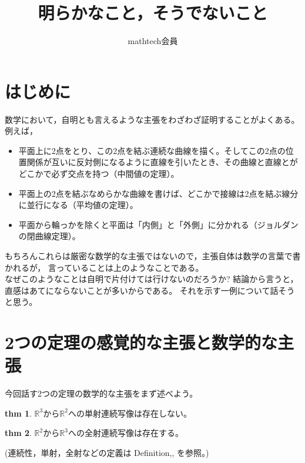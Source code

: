 \documentclass[uplatex]{jsarticle}
\begin{document}
\title{明らかなこと，そうでないこと}
\author{mathtech会員}
\date{}
\maketitle
\newcommand{\R}{\mathbb{R}}
\newcommand{\N}{\mathbb{N}}
\newcommand{\Q}{\mathbb{Q}}
\newcommand{\Z}{\mathbb{Z}}
\newcommand{\C}{\mathbb{C}}
\newcommand{\st}{\sin \theta}
\newcommand{\ct}{\cos \theta}
\newtheorem{命題}{命題}
\newtheorem{thm}{thm}
\theoremstyle{definition}
\newtheorem{dfn}{Definition}
\newtheorem{definition}{Definition}
\newtheorem{fact}{Fact}




\section{はじめに}

数学において，自明とも言えるような主張をわざわざ証明することがよくある。
例えば，\\
\begin{itemize}
    \item 平面上に2点をとり、この2点を結ぶ連続な曲線を描く。そしてこの2点の位置関係が互いに反対側になるように直線を引いたとき、その曲線と直線とがどこかで必ず交点を持つ（中間値の定理）。
    \item 平面上の2点を結ぶなめらかな曲線を書けば、どこかで接線は2点を結ぶ線分に並行になる（平均値の定理）。
    \item 平面から輪っかを除くと平面は「内側」と「外側」に分かれる（ジョルダンの閉曲線定理）。
\end{itemize}

もちろんこれらは厳密な数学的な主張ではないので，主張自体は数学の言葉で書かれるが，
言っていることは上のようなことである。
\\
なぜこのようなことは自明で片付けては行けないのだろうか?
結論から言うと，直感はあてにならないことが多いからである。
それを示す一例について話そうと思う。

\section{2つの定理の感覚的な主張と数学的な主張}
今回話す2つの定理の数学的な主張をまず述べよう。

\begin{thm}\label{thm:injection}
    $
        \mathbb{R}^3から\mathbb{R}^2への単射連続写像は存在しない。
    $
\end{thm}

\begin{thm}\label{thm:surjection}
    $
        \mathbb{R}^2から\mathbb{R}^3への全射連続写像は存在する。
    $
\end{thm}
(連続性，単射，全射などの定義は
Definition,,
を参照。)
\end{document}

